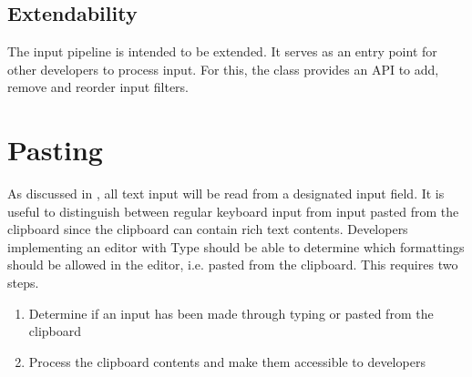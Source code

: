 \subsection{Extendability} The input pipeline is intended to be extended. It serves as an entry point for other developers to process input. For this, the  class provides an API to add, remove and reorder input filters.




\section{Pasting}
\label{sec:impl_pasting}

As discussed in , all text input will be read from a designated input field. It is useful to distinguish between regular keyboard input from input pasted from the clipboard since the clipboard can contain rich text contents. Developers implementing an editor with Type should be able to determine which formattings should be allowed in the editor, i.e. pasted from the clipboard. This requires two steps.

\begin{enumerate}
\item Determine if an input has been made through typing or pasted from the clipboard
\item Process the clipboard contents and make them accessible to developers
\end{enumerate}

